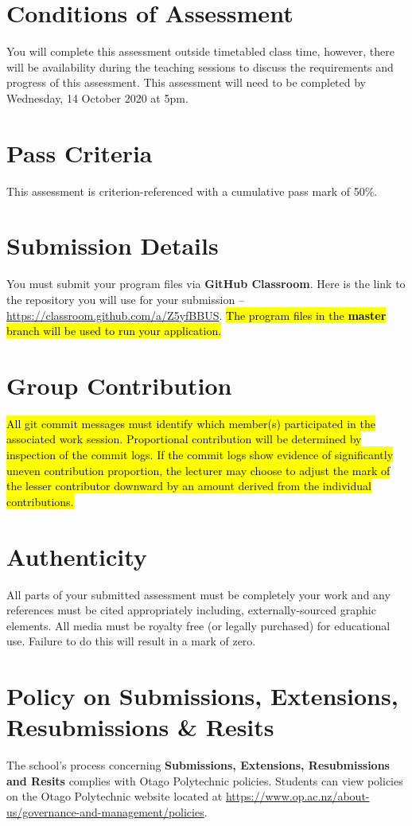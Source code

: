 \documentclass{article}
\begin{document}
\section*{Conditions of Assessment}
You will complete this assessment outside timetabled class time, however, there will be availability during the teaching sessions to discuss the requirements and progress of this assessment. This assessment will need to be completed by Wednesday, 14 October 2020 at 5pm. 

\section*{Pass Criteria}
This assessment is criterion-referenced with a cumulative pass mark of 50\%.

\section*{Submission Details}
You must submit your program files via \textbf{GitHub Classroom}. Here is the link to the repository you will use for your submission – \href{https://classroom.github.com/a/Z5yfBBUS}{https://classroom.github.com/a/Z5yfBBUS}. \hl{The program files in the \textbf{master} branch will be used to run your application.}

\section*{Group Contribution}
\hl{All git commit messages must identify which member(s) participated in the associated work session. Proportional contribution will be determined by inspection of the commit logs. If the commit logs show evidence of significantly uneven contribution proportion, the lecturer may choose to adjust the mark of the lesser contributor downward by an amount derived from the individual contributions.}

\section*{Authenticity}
All parts of your submitted assessment must be completely your work and any references must be cited appropriately including, externally-sourced graphic elements. All media must be royalty free (or legally purchased) for educational use. Failure to do this will result in a mark of zero.

\section*{Policy on Submissions, Extensions, Resubmissions \& Resits}
The school's process concerning \textbf{Submissions, Extensions, Resubmissions and Resits} complies with Otago Polytechnic policies. Students can view policies on the Otago Polytechnic website located at \href{https://www.op.ac.nz/about-us/governance-and-management/policies}{https://www.op.ac.nz/about-us/governance-and-management/policies}.
\end{document}
